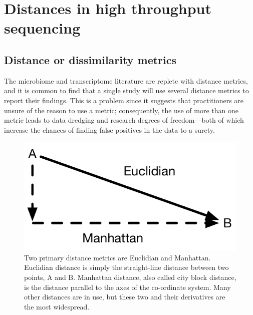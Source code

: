 \documentclass[onecolumn]{article}
\begin{document}
\hypertarget{distances}{%
\section{Distances in high throughput sequencing}\label{distances}}

\hypertarget{distance-or-dissimilarity-metrics}{%
\subsection{Distance or dissimilarity metrics}\label{distance-or-dissimilarity-metrics}}

The microbiome and transcriptome literature are replete with distance metrics, and it is common to find that a single study will use several distance metrics to report their findings. This is a problem since it suggests that practitioners are unsure of the reason to use a metric; consequently, the use of more than one metric leads to data dredging and research degrees of freedom---both of which increase the chances of finding false positives in the data to a surety.

\begin{figure}
\centering
\includegraphics{./figs/distance.pdf}
\caption{Two primary distance metrics are Euclidian and Manhattan. Euclidian distance is simply the straight-line distance between two points, A and B. Manhattan distance, also called city block distance, is the distance parallel to the axes of the co-ordinate system. Many other distances are in use, but these two and their derivatives are the most widespread.}
\end{figure}
\end{document}
